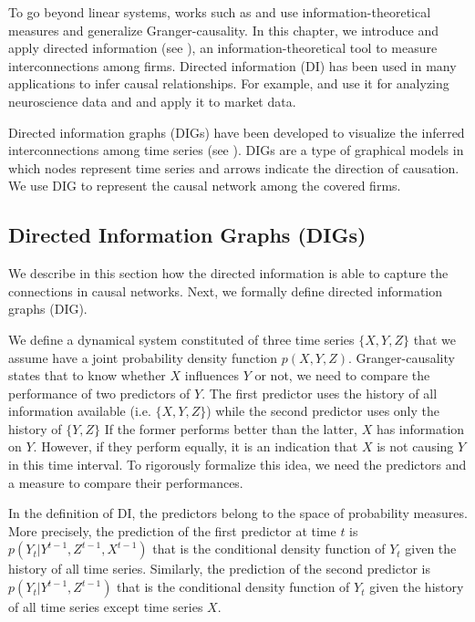 To go beyond linear systems, works such as \citet{directed} and \citet{massey} use information-theoretical measures and generalize Granger-causality. 
In this chapter, we introduce and apply directed information (see \citet{directed}), an information-theoretical tool to measure interconnections among firms.
Directed information (DI) has been used in many applications to infer causal relationships. For example, \citet{spike} and \citet{di12} use it for analyzing neuroscience data and \citet{acc2014}  and \citet{etesami2018econometric} apply it to market data. 


Directed information graphs (DIGs) have been developed to visualize the inferred interconnections among time series (see \citet{directed}).  
DIGs are a type of graphical models in which nodes represent time series and arrows indicate the direction of causation. We use DIG to represent the causal network among the covered firms. 



\subsection{Directed Information Graphs (DIGs)}\label{sec:dig}


We describe in this section how the directed information is able to capture the connections in causal networks. Next, we formally define directed information graphs (DIG).

We define a dynamical system constituted of three time series $\{X,Y,Z\}$ that we assume have a joint probability density function $p(X,Y,Z)$. 
Granger-causality states that to know whether $X$ influences $Y$ or not, we need to compare the performance of two predictors of $Y$.
The first predictor uses the history of all information available (i.e. $\{X,Y,Z\}$) while the second predictor uses only the history of $\{Y,Z\}$
If the former performs better than the latter, $X$ has information on $Y$. However, if they perform equally, it is an indication that $X$ is not causing $Y$ in this time interval.
To rigorously formalize this idea, we need the predictors and a measure to compare their performances.

\clearpage

In the definition of DI,  the predictors belong to the space of probability measures.  
More precisely,  
the prediction of the first predictor at time $t$ is $p(Y_t|Y^{t-1},Z^{t-1},X^{t-1})$ that is the conditional density function of $Y_t$ given the history of all time series. Similarly, the prediction of the second predictor is $p(Y_t|Y^{t-1},Z^{t-1})$ that is the conditional density function of $Y_t$ given the history of all time series except time series $X$.


